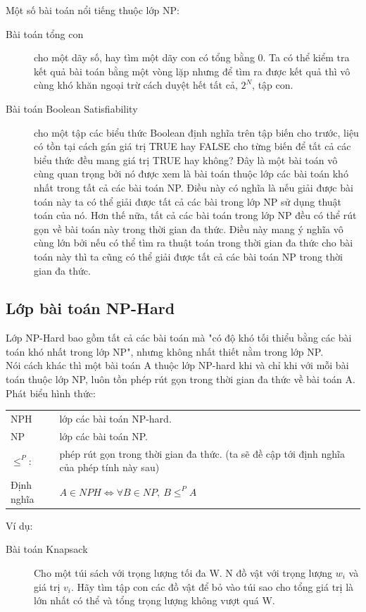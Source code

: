 \documentclass[a4paper 14pt]{article}
\begin{document}
			Một số bài toán nổi tiếng thuộc lớp NP:\\ 
			\begin{description}
				\item[Bài toán tổng con] cho một dãy số, hay tìm một dãy con có tổng bằng 0. Ta có thể kiểm tra kết quả bài toán bằng một vòng lặp nhưng để tìm ra được kết quả thì vô cùng khó khăn ngoại trừ cách duyệt hết tất cả, $2^N$, tập con.
				\item[Bài toán Boolean Satisfiability] \label{EX: NP-C} cho một tập các biểu thức Boolean định nghĩa trên tập biến cho trước, liệu có tồn tại cách gán giá trị TRUE hay FALSE cho từng biến để tất cả các biểu thức đều mang giá trị TRUE hay không? Đây là một bài toán vô cùng quan trọng bởi nó được xem là bài toán thuộc lớp các bài toán khó nhất trong tất cả các bài toán NP. Điều này có nghĩa là nếu giải được bài toán này ta có thể giải được tất cả các bài trong lớp NP sử dụng thuật toán của nó. Hơn thế nữa, tất cả các bài toán trong lớp NP đều có thể rút gọn về bài toán này trong thời gian đa thức. Điều này mang ý nghĩa vô cùng lớn bởi nếu có thể tìm ra thuật toán trong thời gian đa thức cho bài toán này thì ta cũng có thể giải được tất cả các bài toán NP trong thời gian đa thức.
			\end{description}
		\subsection{Lớp bài toán NP-Hard}
			Lớp NP-Hard bao gồm tất cả các bài toán mà "có độ khó tối thiểu bằng các bài toán khó nhất trong lớp NP", nhưng không nhất thiết nằm trong lớp NP.\\
			Nói cách khác thì một bài toán A thuộc lớp NP-hard khi và chỉ khi với mỗi bài toán thuộc lớp NP, luôn tồn phép rút gọn trong thời gian đa thức về bài toán A.\\
			Phát biểu hình thức:
			\begin{addmargin}{0.5in}
				\begin{tabular}{l p{4in}}
				NPH& lớp các bài toán NP-hard.\\
				NP& lớp các bài toán NP.\\
				$\leq^{P}:$& phép rút gọn trong thời gian đa thức. (ta sẽ đề cập tới định nghĩa của phép tính này sau)\\
				Định nghĩa&$A \in NPH \Leftrightarrow \forall B \in NP,~ B \leq^{P} A$
				\end{tabular}
			\end{addmargin}
			Ví dụ:
			\begin{description}
				\item[Bài toán Knapsack]  Cho một túi sách với trọng lượng tối đa W. N đồ vật với trọng lượng $w_{i}$ và giá trị $v_{i}$. Hãy tìm tập con các đồ vật để bỏ vào túi sao cho tổng giá trị là lớn nhất có thể và tổng trọng lượng không vượt quá W.
			\end{description}
\end{document}
